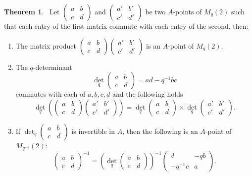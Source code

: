 \documentclass[8pt]{article}
\theoremstyle{definition}
\theoremstyle{definition}
\newtheorem{theorem}{Theorem}[section]
\theoremstyle{definition}
\theoremstyle{definition}
\theoremstyle{definition}
\theoremstyle{definition}
\theoremstyle{definition}
\theoremstyle{definition}
\theoremstyle{definition}
\theoremstyle{definition}
\theoremstyle{definition}
\theoremstyle{definition}
\theoremstyle{definition}
\theoremstyle{definition}
\theoremstyle{question}
\begin{document}
\begin{theorem}~\label{m:point:theorem}
  Let $\begin{pmatrix} a & b\\ c & d \end{pmatrix}$ and $\begin{pmatrix} a' & b' \\ c' & d' \end{pmatrix}$
  be two $A$-points of $M_q(2)$ such that each entry of the first matrix commute 
  with each entry of the second, then:
  \begin{enumerate}
    \item The matrix product $\begin{pmatrix} a & b\\ c & d \end{pmatrix} \begin{pmatrix} a' & b' \\ c' & d' \end{pmatrix}$
    is an $A$-point of $M_q(2)$.
    \item The $q$-determinant
    \[ \operatorname{det}_q\begin{pmatrix} a & b\\ c & d \end{pmatrix} = ad - q^{-1} b c \]
    commutes with each of $a, b,c,d$ and the following holds
    \[
    \operatorname{det}_q \left( \begin{pmatrix} a & b\\ c & d \end{pmatrix} \begin{pmatrix} a' & b' \\ c' & d' \end{pmatrix} \right) = \operatorname{det}_q \begin{pmatrix} a & b\\ c & d \end{pmatrix} \times \operatorname{det}_q \begin{pmatrix} a' & b' \\ c' & d' \end{pmatrix}.
    \]
    \item If $\operatorname{det}_q \begin{pmatrix} a & b\\ c & d \end{pmatrix}$ is invertible in $A$, then the following is an $A$-point
    of $M_{q^{-1}}(2)$:
    \[
    \begin{pmatrix} a & b\\ c & d \end{pmatrix}^{-1} = \left( \operatorname{det}_q \begin{pmatrix} a & b\\ c & d \end{pmatrix} \right)^{-1} \begin{pmatrix} d & -qb \\ -q^{-1}c & a \end{pmatrix}.
    \]
  \end{enumerate}
\end{theorem}
\end{document}

